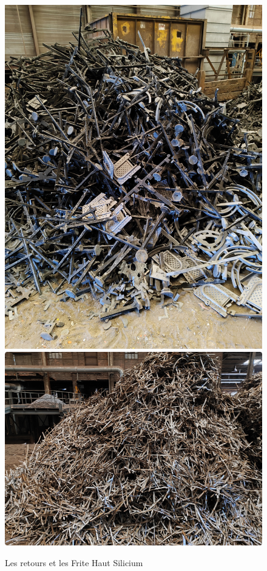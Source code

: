 \documentclass[12pt]{article}
\begin{document}
\begin{enumerate}
    \begin{figure}[H]
        \centering
        \vfill
        \hspace{0.8 cm}
        \includegraphics[scale=0.7]{Images/Presentation/Les Retours.pdf}
        \hspace{0.5 cm}
        \includegraphics[scale=0.7]{Images/Presentation/Frite Haut Silicium.pdf}
        \caption{Les retours et les Frite Haut Silicium}
    \end{figure}


\end{enumerate}
\end{document}
